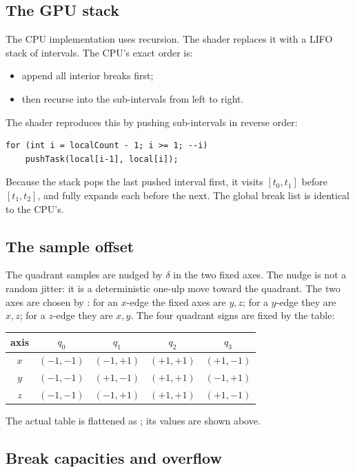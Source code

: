 \subsection{The GPU stack}

The CPU implementation uses recursion.  The shader replaces it with a LIFO
stack of intervals.  The CPU's exact order is:
\begin{itemize}
\item append all interior breaks first;
\item then recurse into the sub-intervals from left to right.
\end{itemize}
The shader reproduces this by pushing sub-intervals in reverse order:
\begin{lstlisting}[style=glsl,caption={Reverse push preserves the CPU order.},label={lst:push}]
for (int i = localCount - 1; i >= 1; --i)
    pushTask(local[i-1], local[i]);
\end{lstlisting}
Because the stack pops the last pushed interval first, it visits
$[t_0,t_1]$ before $[t_1,t_2]$, and fully expands each before the next.
The global break list is identical to the CPU's.

\subsection{The sample offset}

The quadrant samples are nudged by $\delta$ in the two fixed axes.  The
nudge is not a random jitter: it is a deterministic one-ulp move toward the
quadrant.  The two axes are chosen by : for an $x$-edge the
fixed axes are $y,z$; for a $y$-edge they are $x,z$; for a $z$-edge they
are $x,y$.  The four quadrant signs are fixed by the 
table:
\begin{center}
\begin{tabular}{@{}c|cccc@{}}
\toprule
axis & $q_0$ & $q_1$ & $q_2$ & $q_3$\\
\midrule
$x$ & $(-1,-1)$ & $(-1,+1)$ & $(+1,+1)$ & $(+1,-1)$\\
$y$ & $(-1,-1)$ & $(+1,-1)$ & $(+1,+1)$ & $(-1,+1)$\\
$z$ & $(-1,-1)$ & $(-1,+1)$ & $(+1,+1)$ & $(+1,-1)$\\
\bottomrule
\end{tabular}
\end{center}
The actual table is flattened as
; its values are shown above.

\subsection{Break capacities and overflow}


